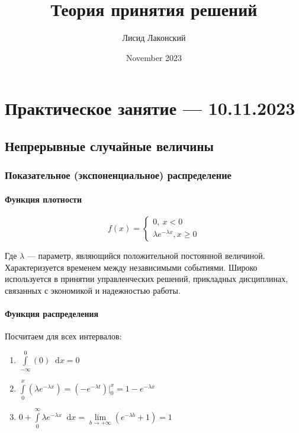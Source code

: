 \documentclass{article}
\title{Теория принятия решений}
\author{Лисид Лаконский}
\date{November 2023}
\newcommand*\diff{\mathop{}\!\mathrm{d}}
\begin{document}
\raggedright

\maketitle

\tableofcontents
\pagebreak

\section{Практическое занятие — 10.11.2023}

\subsection{Непрерывные случайные величины}

\subsubsection{Показательное (экспоненциальное) распределение}

\paragraph{Функция плотности}

$$
f(x) = \begin{cases}
    0, \ x < 0 \\
    \lambda e^{-\lambda x}, x \ge 0
\end{cases}
$$

Где $\lambda$ — параметр, являющийся положительной постоянной величиной. Характеризуется временем между независимыми событиями. Широко используется в принятии управленческих решений, прикладных дисциплинах, связанных с экономикой и надежностью работы.

\paragraph{Функция распределения}

Посчитаем для всех интервалов:

\begin{enumerate}
    \item $\int\limits_{-\infty}^{0} (0) \diff x = 0$
    \item $\int\limits_{0}^{x} (\lambda e^{-\lambda x}) = (-e^{-\lambda t}) \bigg|_{0}^{x} = 1 - e^{-\lambda x}$
    \item $0 + \int\limits_{0}^{\infty} \lambda e^{-\lambda x} \diff x = \lim\limits_{b \to +\infty} (e^{-\lambda b} + 1) = 1$
\end{enumerate}
\end{document}
